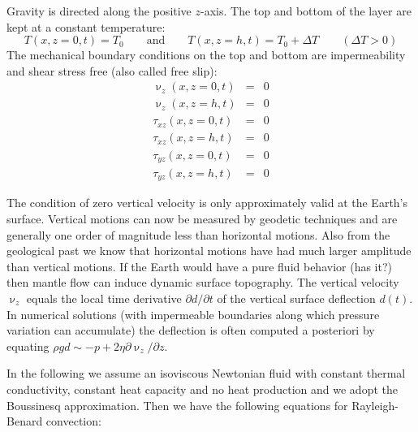 Gravity is directed along the positive $z$-axis. The top and bottom of the layer are kept at a
constant temperature:
\begin{equation}
T(x,z=0,t)=T_0 
\qquad
\text{and}
\qquad
T(x,z=h,t)=T_0 + \Delta T \qquad (\Delta T>0)
\end{equation}
The mechanical boundary conditions on the top and bottom are impermeability and shear
stress free (also called free slip):
\begin{eqnarray}
\upnu_z(x,z=0,t) &=& 0 \\
\upnu_z(x,z=h,t) &=& 0 \\
\tau_{xz}(x,z=0,t) &=& 0 \\
\tau_{xz}(x,z=h,t) &=& 0 \\
\tau_{yz}(x,z=0,t) &=& 0 \\
\tau_{yz}(x,z=h,t) &=& 0 
\end{eqnarray}

\vspace{0.5cm}
\vspace{0.5cm}

The condition of zero vertical velocity is only approximately valid at the Earth’s surface.
Vertical motions can now be measured by geodetic techniques and are generally one
order of magnitude less than horizontal motions. Also from the geological past we know
that horizontal motions have had much larger amplitude than vertical motions. If the
Earth would have a pure fluid behavior (has it?) then mantle flow can induce dynamic
surface topography. The vertical velocity $\upnu_z$ equals the local time derivative
$\partial d/\partial t$ of the vertical surface deflection $d(t)$. 
In numerical solutions (with impermeable boundaries
along which pressure variation can accumulate) the deflection is often computed a
posteriori by equating $\rho g d \sim -p + 2\eta \partial \upnu_z/\partial z$.

In the following we assume an isoviscous Newtonian fluid with constant thermal
conductivity, constant heat capacity and no heat production and we adopt the Boussinesq
approximation. Then we have the following equations for Rayleigh-Benard convection:

